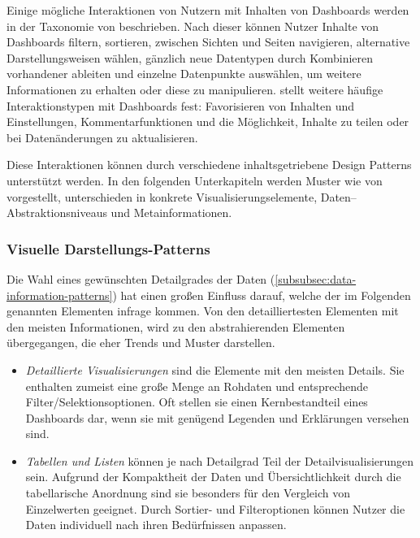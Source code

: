 Einige mögliche Interaktionen von Nutzern mit Inhalten von Dashboards werden in der Taxonomie von \autocite[S. 1]{Heer.InteractiveDynamicsVisualAnalysis.2012} beschrieben.
Nach dieser können Nutzer Inhalte von Dashboards filtern, sortieren, zwischen Sichten und Seiten navigieren, alternative Darstellungsweisen wählen, gänzlich neue Datentypen durch Kombinieren vorhandener ableiten und einzelne Datenpunkte auswählen, um weitere Informationen zu erhalten oder diese zu manipulieren.
\autocite[S. 25]{MarcusHomannVassilenaBanovaPaulOelbermannHolgerWittgesandHelmutKrcmar.TowardsUserInterfaceComponentsforDashboardApplicationsonSmartphones.2013} stellt weitere häufige Interaktionstypen mit Dashboards fest:
Favorisieren von Inhalten und Einstellungen, Kommentarfunktionen und die Möglichkeit, Inhalte zu teilen oder bei Datenänderungen zu aktualisieren.

Diese Interaktionen können durch verschiedene inhaltsgetriebene Design Patterns unterstützt werden.
In den folgenden Unterkapiteln werden Muster wie von \autocite[S. 3--5]{Bach.DashboardDesignPatterns.2023} vorgestellt, unterschieden in konkrete Visualisierungselemente, Daten--Abstraktionsniveaus und Metainformationen.

\subsubsection{Visuelle Darstellungs-Patterns}

Die Wahl eines gewünschten Detailgrades der Daten (\autoref{subsubsec:data-information-patterns}) hat einen großen Einfluss darauf, welche der im Folgenden genannten Elementen infrage kommen.
Von den detailliertesten Elementen mit den meisten Informationen, wird zu den abstrahierenden Elementen übergegangen, die eher Trends und Muster darstellen.

\begin{itemize}
    \item \emph{Detaillierte Visualisierungen} sind die Elemente mit den meisten Details.
    Sie enthalten zumeist eine große Menge an Rohdaten und entsprechende Filter/Selektionsoptionen.
    Oft stellen sie einen Kernbestandteil eines Dashboards dar, wenn sie mit genügend Legenden und Erklärungen versehen sind.
    \item \emph{Tabellen und Listen} können je nach Detailgrad Teil der Detailvisualisierungen sein.
    Aufgrund der Kompaktheit der Daten und Übersichtlichkeit durch die tabellarische Anordnung sind sie besonders für den Vergleich von Einzelwerten geeignet.
    Durch Sortier- und Filteroptionen können Nutzer die Daten individuell nach ihren Bedürfnissen anpassen.
\end{itemize}

